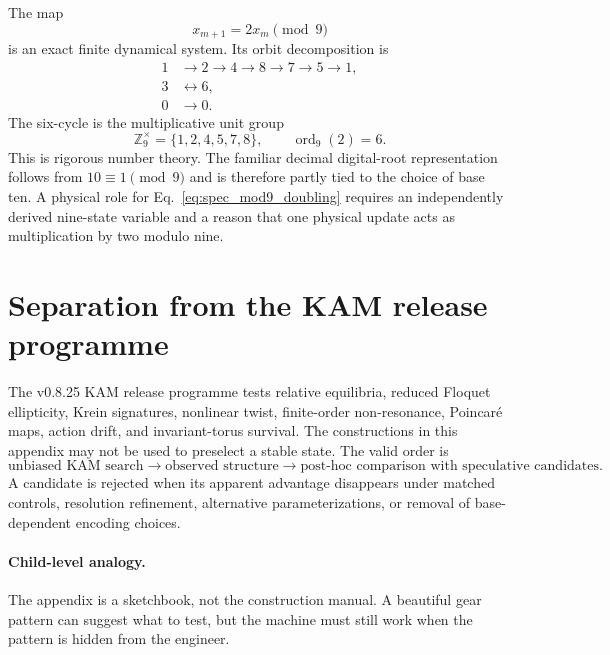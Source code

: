\documentclass[11pt]{article}
\newcommand{\Z}{\mathbb Z}
\begin{document}
The map
\begin{equation}
    x_{m+1}=2x_m\pmod 9
    \label{eq:spec_mod9_doubling}
\end{equation}
is an exact finite dynamical system.  Its orbit decomposition is
\begin{align}
    1&\rightarrow2\rightarrow4\rightarrow8\rightarrow7\rightarrow5\rightarrow1,
    \\
    3&\leftrightarrow6,
    \\
    0&\rightarrow0.
\end{align}
The six-cycle is the multiplicative unit group
\begin{equation}
    \Z_9^{\times}=\{1,2,4,5,7,8\},
    \qquad
    \operatorname{ord}_9(2)=6.
\end{equation}
This is rigorous number theory.  The familiar decimal digital-root
representation follows from $10\equiv1\pmod9$ and is therefore partly tied to
the choice of base ten.  A physical role for Eq.~\eqref{eq:spec_mod9_doubling}
requires an independently derived nine-state variable and a reason that one
physical update acts as multiplication by two modulo nine.

\section{Separation from the KAM release programme}

The v0.8.25 KAM release programme tests relative equilibria, reduced Floquet
ellipticity, Krein signatures, nonlinear twist, finite-order non-resonance,
Poincar\'e maps, action drift, and invariant-torus survival.  The constructions
in this appendix may not be used to preselect a stable state.  The valid order
is
\begin{equation}
    \text{unbiased KAM search}
    \longrightarrow
    \text{observed structure}
    \longrightarrow
    \text{post-hoc comparison with speculative candidates}.
\end{equation}
A candidate is rejected when its apparent advantage disappears under matched
controls, resolution refinement, alternative parameterizations, or removal of
base-dependent encoding choices.

\paragraph{Child-level analogy.}
The appendix is a sketchbook, not the construction manual.  A beautiful gear
pattern can suggest what to test, but the machine must still work when the
pattern is hidden from the engineer.
\end{document}
